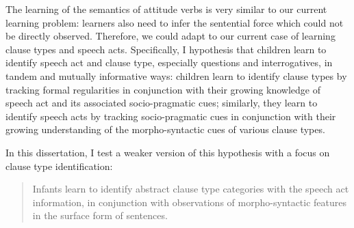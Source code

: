 The learning of the semantics of attitude verbs is very similar to our current learning problem: learners also need to infer the sentential force which could not be directly observed. %
Therefore, we could adapt to our current case of learning clause types and speech acts. Specifically, I hypothesis that children learn to identify speech act and clause type, especially questions and interrogatives, in tandem and mutually informative ways: children learn to identify clause types by tracking formal regularities in conjunction with their growing knowledge of speech act and its associated socio-pragmatic cues; similarly, they learn to identify speech acts by tracking socio-pragmatic cues in conjunction with their growing understanding of the morpho-syntactic cues of various clause types.


In this dissertation, I test a weaker version of this hypothesis with a focus on clause type identification:

\begin{quote}
Infants learn to identify abstract clause type categories with the speech act information, in conjunction with observations of morpho-syntactic features in the surface form of sentences.
\end{quote}


